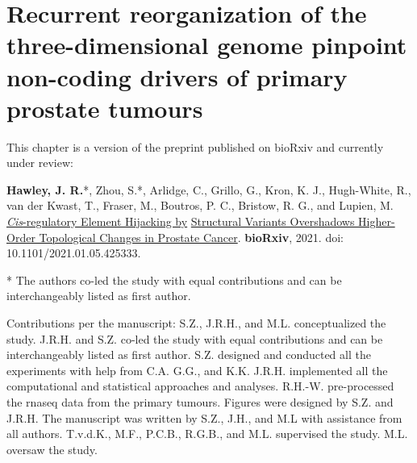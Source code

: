 \chapter{Recurrent reorganization of the three-dimensional genome pinpoint non-coding drivers of primary prostate tumours}
\label{chap:3D}

This chapter is a version of the preprint published on bioRxiv and currently under review:

\textbf{Hawley, J. R.}*, Zhou, S.*, Arlidge, C., Grillo, G., Kron, K. J., Hugh-White, R., van der Kwast, T., Fraser, M., Boutros, P. C., Bristow, R. G., and Lupien, M.
\underline{\emph{Cis}-regulatory Element Hijacking by} \underline{Structural Variants Overshadows Higher-Order Topological Changes in Prostate Cancer}.
\textbf{bioRxiv}, 2021.
doi: 10.1101/2021.01.05.425333.

* The authors co-led the study with equal contributions and can be interchangeably listed as first author.

\vspace{1em}

Contributions per the manuscript:
S.Z., J.R.H., and M.L. conceptualized the study.
J.R.H. and S.Z. co-led the study with equal contributions and can be interchangeably listed as first author.
S.Z. designed and conducted all the experiments with help from C.A. G.G., and K.K.
J.R.H. implemented all the computational and statistical approaches and analyses.
R.H.-W. pre-processed the \gls{rnaseq} data from the primary tumours.
Figures were designed by S.Z. and J.R.H.
The manuscript was written by S.Z., J.H., and M.L with assistance from all authors.
T.v.d.K., M.F., P.C.B., R.G.B., and M.L. supervised the study.
M.L. oversaw the study.






